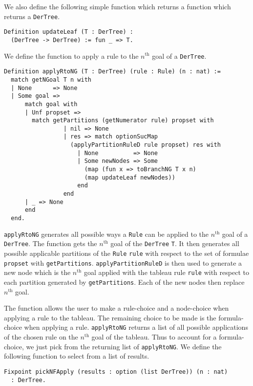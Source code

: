 \documentclass{llncs}
\begin{document}
We also define the following simple function which returns a function which
returns a \verb+DerTree+.
%
\begin{verbatim}
Definition updateLeaf (T : DerTree) :
  (DerTree -> DerTree) := fun _ => T.
\end{verbatim}
%
We define the function to apply a rule to the $n^{\textrm{th}}$ goal of a
\verb+DerTree+.
%
\begin{verbatim}
Definition applyRtoNG (T : DerTree) (rule : Rule) (n : nat) :=
  match getNGoal T n with
  | None      => None
  | Some goal => 
      match goal with
      | Unf propset =>
        match getPartitions (getNumerator rule) propset with
                 | nil => None
                 | res => match optionSucMap
                   (applyPartitionRuleD rule propset) res with
                     | None          => None
                     | Some newNodes => Some
                       (map (fun x => toBranchNG T x n)
                       (map updateLeaf newNodes))
                     end
                 end
      | _ => None
      end
  end.
\end{verbatim}
%
\verb+applyRtoNG+ generates all possible ways a \verb+Rule+ can be applied to
the $n^{\textrm{th}}$ goal of a \verb+DerTree+. The function gets the
$n^{\textrm{th}}$ goal of the \verb+DerTree+ \verb+T+. It then generates all
possible applicable partitions of the \verb+Rule+ \verb+rule+ with respect to
the set of formulae \verb+propset+ with \verb+getPartitions+.
\verb+applyPartitionRuleD+ is then used to generate a new node which is the
$n^{\textrm{th}}$ goal applied with the  tableau rule \verb+rule+ with respect
to each partition generated by \verb+getPartitions+. Each of the new nodes
then replace $n^{\textrm{th}}$ goal.

The function allows the user to make a rule-choice and a node-choice when
applying a rule to the tableau. The remaining choice to be made is the
formula-choice when applying a rule. \verb+applyRtoNG+ returns a list of all
possible applications of the chosen rule on the $n^{\textrm{th}}$ goal of the
tableau. Thus to account for a formula-choice, we just pick from the returning
list of \verb+applyRtoNG+. We define the following function to select from a
list of results.
%
\begin{verbatim}
Fixpoint pickNFApply (results : option (list DerTree)) (n : nat)
  : DerTree.
\end{verbatim}
%
\end{document}
